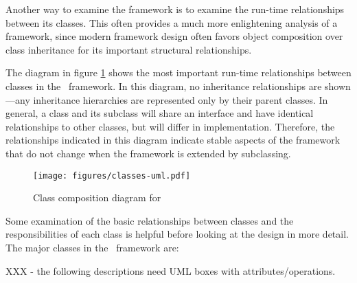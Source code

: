 Another way to examine the framework is to examine the run-time
relationships between its classes.  This often provides a much more
enlightening analysis of a framework, since modern framework design
often favors object composition over class inheritance for its
important structural relationships. \cite[p. 20]{gamma:95}

The diagram in figure \ref{classes-uml} shows the
most important run-time relationships between classes in the
\aicat\ framework.  In this diagram, no inheritance
relationships are shown---any inheritance hierarchies are represented
only by their parent classes.  In general, a class and its subclass
will share an interface and have identical relationships to other
classes, but will differ in implementation.  Therefore, the
relationships indicated in this diagram indicate stable aspects of the
framework that do not change when the framework is extended by
subclassing.

\begin{figure}
\texttt{[image: figures/classes-uml.pdf]}
\caption{Class composition diagram for \aicat}
\label{classes-uml}
\end{figure}

Some examination of the basic relationships between classes and the
responsibilities of each class is helpful before looking at the design
in more detail.  The major classes in the \aicat\ framework
are:

XXX - the following descriptions need UML boxes with attributes/operations.

